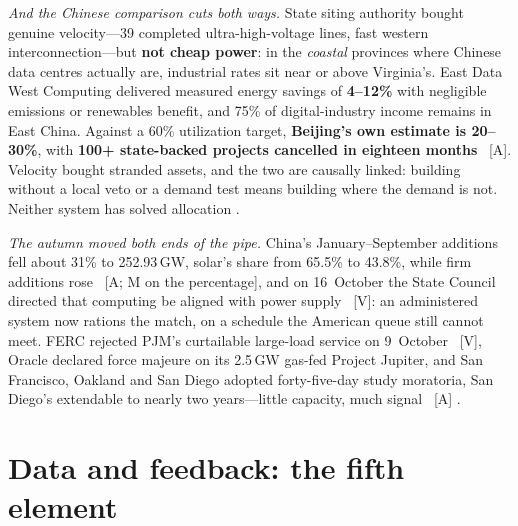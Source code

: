 \emph{And the Chinese comparison cuts both ways.} State siting authority bought genuine velocity---39 completed ultra-high-voltage lines, fast western interconnection---but \textbf{not cheap power}: in the \emph{coastal} provinces where Chinese data centres actually are, industrial rates sit near or above Virginia's. East Data West Computing delivered measured energy savings of \textbf{4--12\%} with negligible emissions or renewables benefit, and 75\% of digital-industry income remains in East China. Against a 60\% utilization target, \textbf{Beijing's own estimate is 20--30\%}, with \textbf{100+ state-backed projects cancelled in eighteen months}~\cite{china-dc-utilization} [A]. Velocity bought stranded assets, and the two are causally linked: building without a local veto or a demand test means building where the demand is not. Neither system has solved allocation .

\emph{The autumn moved both ends of the pipe.} China's January--September additions fell about 31\% to 252.93\,GW, solar's share from 65.5\% to 43.8\%, while firm additions rose~\cite{cap-china-additions} [A; M on the percentage], and on 16~October the State Council directed that computing be aligned with power supply~\cite{cap-state-council-oct} [V]: an administered system now rations the match, on a schedule the American queue still cannot meet. FERC rejected PJM's curtailable large-load service on 9~October~\cite{cap-ferc-pjm-oct} [V], Oracle declared force majeure on its 2.5\,GW gas-fed Project Jupiter, and San Francisco, Oakland and San Diego adopted forty-five-day study moratoria, San Diego's extendable to nearly two years---little capacity, much signal~\cite{cap-dc-obstacles,cap-moratoria-autumn} [A] .

\section{Data and feedback: the fifth element}
\label{c:data}

